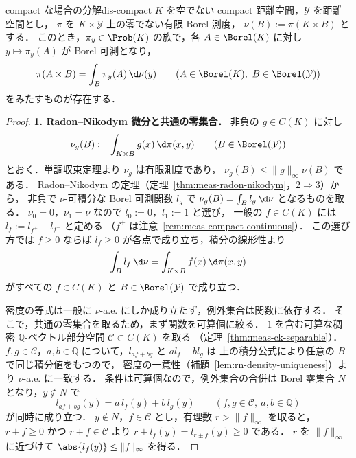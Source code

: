 \begin{lemma}{compact な場合の分解}{dis-compact}
  $K$ を空でない compact 距離空間，$\mathcal{Y}$ を距離空間とし，
  $\pi$ を $K\times\mathcal{Y}$ 上の零でない有限 Borel 測度，
  $\nu(B):=\pi(K\times B)$ とする．
  このとき，$\pi_y\in\Prob(K)$ の族で，各 $A\in\Borel(K)$ に対し $y\mapsto\pi_y(A)$ が Borel 可測となり，
  \[
    \pi(A\times B)=\int_B\pi_y(A)\,\d\nu(y)
    \qquad(A\in\Borel(K),\ B\in\Borel(\mathcal{Y}))
  \]
  をみたすものが存在する．
\end{lemma}

\begin{proof}
  \textbf{1. Radon--Nikodym 微分と共通の零集合．}
  非負の $g\in C(K)$ に対し
  \[
    \nu_g(B):=\int_{K\times B}g(x)\,\d\pi(x,y)
    \qquad(B\in\Borel(\mathcal{Y}))
  \]
  とおく．単調収束定理より $\nu_g$ は有限測度であり，
  $\nu_g(B)\leq\lVert g\rVert_\infty\nu(B)$ である．
  Radon--Nikodym の定理（定理~\ref{thm:meas-radon-nikodym}，$2\Rightarrow3$）から，
  非負で $\nu$-可積分な Borel 可測関数 $l_g$ で
  $\nu_g(B)=\int_Bl_g\,\d\nu$ となるものを取る．
  $\nu_0=0$，$\nu_1=\nu$ なので $l_0:=0$，$l_1:=1$ と選び，
  一般の $f\in C(K)$ には $l_f:=l_{f^+}-l_{f^-}$ と定める
  （$f^\pm$ は注意~\ref{rem:meas-compact-continuous}）．
  この選び方では $f\geq0$ ならば $l_f\geq0$ が各点で成り立ち，積分の線形性より
  \[
    \int_Bl_f\,\d\nu=\int_{K\times B}f(x)\,\d\pi(x,y)
  \]
  がすべての $f\in C(K)$ と $B\in\Borel(\mathcal{Y})$ で成り立つ．

  密度の等式は一般に $\nu$-a.e. にしか成り立たず，例外集合は関数に依存する．
  そこで，共通の零集合を取るため，まず関数を可算個に絞る．
  $1$ を含む可算な稠密 $\mathbb{Q}$-ベクトル部分空間 $\mathcal{C}\subset C(K)$ を取る
  （定理~\ref{thm:meas-ck-separable}）．
  $f,g\in\mathcal{C}$，$a,b\in\mathbb{Q}$ について，$l_{af+bg}$ と $al_f+bl_g$ は
  上の積分公式により任意の $B$ で同じ積分値をもつので，
  密度の一意性（補題~\ref{lem:rn-density-uniqueness}）より $\nu$-a.e. に一致する．
  条件は可算個なので，例外集合の合併は Borel 零集合 $N$ となり，$y\notin N$ で
  \[
    l_{af+bg}(y)=a\,l_f(y)+b\,l_g(y)\qquad(f,g\in\mathcal{C},\ a,b\in\mathbb{Q})
  \]
  が同時に成り立つ．
  $y\notin N$，$f\in\mathcal{C}$ とし，有理数 $r>\lVert f\rVert_\infty$ を取ると，
  $r\pm f\geq0$ かつ $r\pm f\in\mathcal{C}$ より $r\pm l_f(y)=l_{r\pm f}(y)\geq0$ である．
  $r$ を $\lVert f\rVert_\infty$ に近づけて $\abs{l_f(y)}\leq\lVert f\rVert_\infty$ を得る．


\end{proof}
